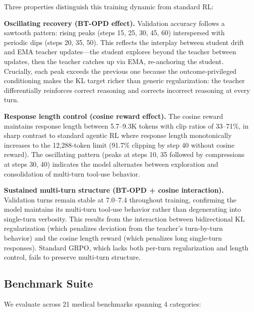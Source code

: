 \documentclass{article}
\begin{document}
Three properties distinguish this training dynamic from standard RL:

\textbf{Oscillating recovery (BT-OPD effect).} Validation accuracy follows a sawtooth pattern: rising peaks (steps 15, 25, 30, 45, 60) interspersed with periodic dips (steps 20, 35, 50). This reflects the interplay between student drift and EMA teacher updates---the student explores beyond the teacher between updates, then the teacher catches up via EMA, re-anchoring the student. Crucially, each peak exceeds the previous one because the outcome-privileged conditioning makes the KL target richer than generic regularization: the teacher differentially reinforces correct reasoning and corrects incorrect reasoning at every turn.

\textbf{Response length control (cosine reward effect).} The cosine reward maintains response length between 5.7--9.3K tokens with clip ratios of 33--71\%, in sharp contrast to standard agentic RL where response length monotonically increases to the 12,288-token limit (91.7\% clipping by step 40 without cosine reward). The oscillating pattern (peaks at steps 10, 35 followed by compressions at steps 30, 40) indicates the model alternates between exploration and consolidation of multi-turn tool-use behavior.

\textbf{Sustained multi-turn structure (BT-OPD + cosine interaction).} Validation turns remain stable at 7.0--7.4 throughout training, confirming the model maintains its multi-turn tool-use behavior rather than degenerating into single-turn verbosity. This results from the interaction between bidirectional KL regularization (which penalizes deviation from the teacher's turn-by-turn behavior) and the cosine length reward (which penalizes long single-turn responses). Standard GRPO, which lacks both per-turn regularization and length control, fails to preserve multi-turn structure.


\subsection{Benchmark Suite}
\label{sec:benchmarks}

We evaluate across 21 medical benchmarks spanning 4 categories:
\end{document}
